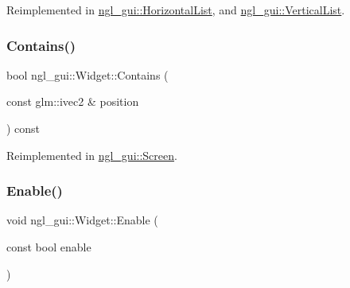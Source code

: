 Reimplemented in \mbox{\hyperlink{classngl__gui_1_1_horizontal_list_a3dcb8fc4e780268899d12ecc3980bc16}{ngl\+\_\+gui\+::\+Horizontal\+List}}, and \mbox{\hyperlink{classngl__gui_1_1_vertical_list_ae8bd79a7e0e91778acb2d93085763138}{ngl\+\_\+gui\+::\+Vertical\+List}}.

\mbox{\label{classngl__gui_1_1_widget_a4199c5d671b55c1de6bcdd4ab2772080}} 
\subsubsection{\texorpdfstring{Contains()}{Contains()}}
{\footnotesize\ttfamily bool ngl\+\_\+gui\+::\+Widget\+::\+Contains (\begin{DoxyParamCaption}\item[{const glm\+::ivec2 \&}]{position }\end{DoxyParamCaption}) const\hspace{0.3cm}{\ttfamily [virtual]}}



Reimplemented in \mbox{\hyperlink{classngl__gui_1_1_screen_ac9e4f72e9a02a0df46f279076cfcef31}{ngl\+\_\+gui\+::\+Screen}}.

\mbox{\label{classngl__gui_1_1_widget_a68032269b8c0f1dcce8e43a6c887b104}} 
\subsubsection{\texorpdfstring{Enable()}{Enable()}}
{\footnotesize\ttfamily void ngl\+\_\+gui\+::\+Widget\+::\+Enable (\begin{DoxyParamCaption}\item[{const bool}]{enable }\end{DoxyParamCaption})\hspace{0.3cm}{\ttfamily [virtual]}}

\mbox{\label{classngl__gui_1_1_widget_a4b68cbec4ac4ad3437e61a02ad03aa91}} 
